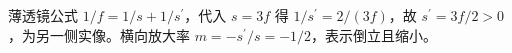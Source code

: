 薄透镜公式 $1/f=1/s+1/s^{\prime}$，代入 $s=3f$ 得 $1/s^{\prime}=2/(3f)$，故 $s^{\prime}=3f/2>0$，为另一侧实像。横向放大率 $m=-s^{\prime}/s=-1/2$，表示倒立且缩小。
